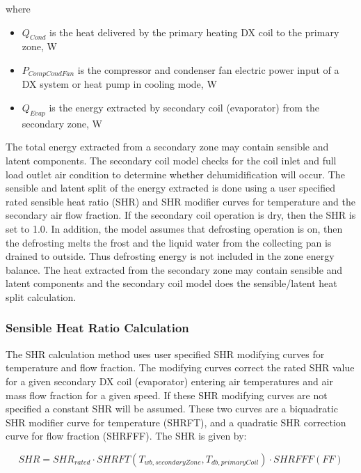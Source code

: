 where

\begin{itemize}
\tightlist
\item
  \(Q_{Cond}\) is the heat delivered by the primary heating DX coil to the primary zone, W
\item
  \(P_{CompCondFan}\) is the compressor and condenser fan electric power input of a DX system or heat pump in cooling mode, W
\item
  \(Q_{Evap}\) is the energy extracted by secondary coil (evaporator) from the secondary zone, W
\end{itemize}

The total energy extracted from a secondary zone may contain sensible and latent components. The secondary coil model checks for the coil inlet and full load outlet air condition to determine whether dehumidification will occur. The sensible and latent split of the energy extracted is done using a user specified rated sensible heat ratio (SHR) and SHR modifier curves for temperature and the secondary air flow fraction. If the secondary coil operation is dry, then the SHR is set to 1.0. In addition, the model assumes that defrosting operation is on, then the defrosting melts the frost and the liquid water from the collecting pan is drained to outside. Thus defrosting energy is not included in the zone energy balance. The heat extracted from the secondary zone may contain sensible and latent components and the secondary coil model does the sensible/latent heat split calculation.

\subsubsection{Sensible Heat Ratio Calculation}\label{sensible-heat-ratio-calculation}

The SHR calculation method uses user specified SHR modifying curves for temperature and flow fraction. The modifying curves correct the rated SHR value for a given secondary DX coil (evaporator) entering air temperatures and air mass flow fraction for a given speed. If these SHR modifying curves are not specified a constant SHR will be assumed. These two curves are a biquadratic SHR modifier curve for temperature (SHRFT), and a quadratic SHR correction curve for flow fraction (SHRFFF). The SHR is given by:

\begin{equation}
SHR = SHR_{rated}\cdot SHRFT\left(T_{wb,secondaryZone},T_{db,primaryCoil}\right)\cdot SHRFFF(FF)
\end{equation}

